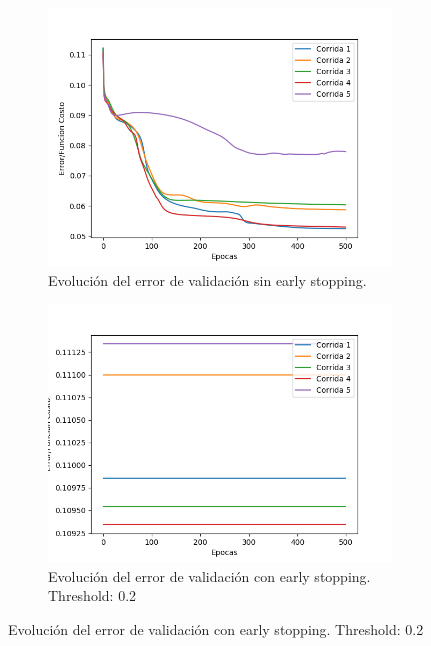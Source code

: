 \begin{figure}[!htbp]
\centering
\begin{subfigure}{.5\textwidth}
  \centering
  \includegraphics[width=1\linewidth]{graficos/ej2/early_stopping_validacion_0.png}
  \caption{Evolución del error de validación sin early stopping.}
  \label{fig:sub1}
\end{subfigure}%
\begin{subfigure}{.5\textwidth}
  \centering
  \includegraphics[width=1\linewidth]{graficos/ej2/early_stopping_validacion_0_2.png}
  \caption{Evolución del error de validación con early stopping. Threshold: 0.2}
  \label{fig:sub2}
\end{subfigure}
\end{figure}

